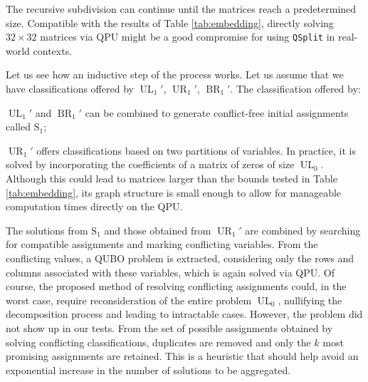 \documentclass{ceurart}
\begin{document}
The recursive subdivision can continue until the matrices reach a predetermined size. Compatible with the results of Table \ref{tab:embedding}, directly solving $32 \times 32$ matrices via QPU might be a good compromise for using \verb|QSplit| in real-world contexts.

Let us see how an inductive step of the process works. Let us assume that we have classifications offered by $\operatorname{UL}_1'$, $\operatorname{UR}_1'$, $\operatorname{BR}_1'$. The classification offered by:
\begin{enumerate*}[label=\arabic*)]
    \item $\operatorname{UL}_1'$ and $\operatorname{BR}_1'$ can be combined to generate conflict-free initial assignments called $\operatorname{S_1}$;
    \item $\operatorname{UR}_1'$ offers classifications based on two partitions of variables. In practice, it is solved by incorporating the coefficients of a matrix of zeros of size $\operatorname{UL}_0$. Although this could lead to matrices larger than the bounds tested in Table \ref{tab:embedding}, its graph structure is small enough to allow for manageable computation times directly on the QPU.
\end{enumerate*}
The solutions from $\operatorname{S_1}$ and those obtained from $\operatorname{UR}_1'$ are combined by searching for compatible assignments and marking conflicting variables. From the conflicting values, a QUBO problem is extracted, considering only the rows and columns associated with these variables, which is again solved via QPU. Of course, the proposed method of resolving conflicting assignments could, in the worst case, require reconsideration of the entire problem \(\operatorname{UL}_0\), nullifying the decomposition process and leading to intractable cases. However, the problem did not show up in our tests. From the set of possible assignments obtained by solving conflicting classifications, duplicates are removed and only the $k$ most promising assignments are retained. This is a heuristic that should help avoid an exponential increase in the number of solutions to be aggregated.
\end{document}
